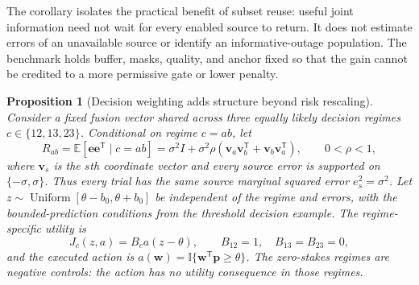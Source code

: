 \documentclass[10pt]{article}
\newtheorem{proposition}{Proposition}
\begin{document}
The corollary isolates the practical benefit of subset reuse: useful joint
information need not wait for every enabled source to return. It does not
estimate errors of an unavailable source or identify an informative-outage
population. The benchmark holds buffer, masks, quality, and anchor fixed so
that the gain cannot be credited to a more permissive gate or lower penalty.

\begin{proposition}[Decision weighting adds structure beyond risk rescaling]
\label{prop:decision-weighting-increment}
Consider a fixed fusion vector shared across three equally likely decision
regimes $c\in\{12,13,23\}$. Conditional on regime $c=ab$, let
\begin{equation}
 R_{ab}=\mathbb E[\boldsymbol e\boldsymbol e^{\mathsf T}\mid c=ab]
 =\sigma^2 I+\sigma^2\rho
 (\boldsymbol v_a\boldsymbol v_b^{\mathsf T}
  +\boldsymbol v_b\boldsymbol v_a^{\mathsf T}),
 \qquad 0<\rho<1,
 \label{eq:regime-conditional-errors}
\end{equation}
where $\boldsymbol v_s$ is the $s$th coordinate vector and every source
error is supported on $\{-\sigma,\sigma\}$. Thus every trial has the same
source marginal squared error $e_s^2=\sigma^2$. Let
$z\sim\operatorname{Uniform}[\theta-b_0,\theta+b_0]$ be independent of the
regime and errors, with the bounded-prediction conditions from the threshold
decision example. The regime-specific utility is
\begin{equation}
 J_c(z,a)=B_c a(z-\theta),\qquad
 B_{12}=1,\quad B_{13}=B_{23}=0,
\end{equation}
and the executed action is
$a(\boldsymbol w)=\mathbb I\{\boldsymbol w^{\mathsf T}\boldsymbol p\ge\theta\}$.
The zero-stakes regimes are negative controls: the action has no utility
consequence in those regimes.


\end{proposition}
\end{document}
